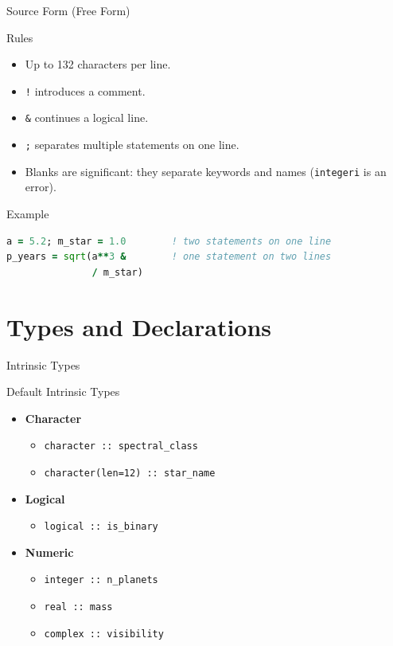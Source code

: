 \begin{frame}[fragile]{Source Form (Free Form)}
\begin{block}{Rules}
\begin{itemize}
\item Up to 132 characters per line.
\item \texttt{!} introduces a comment.
\item \texttt{\&} continues a logical line.
\item \texttt{;} separates multiple statements on one line.
\item Blanks are significant: they separate keywords and names (\texttt{integeri} is an error).
\end{itemize}
\end{block}
\begin{block}{Example}
\begin{lstlisting}[language=Fortran]
a = 5.2; m_star = 1.0        ! two statements on one line
p_years = sqrt(a**3 &        ! one statement on two lines
               / m_star)
\end{lstlisting}
\end{block}
\end{frame}

\section{Types and Declarations}

\begin{frame}{Intrinsic Types}
  \begin{block}{Default Intrinsic Types}
  \begin{itemize}
    \item \textbf{Character}
    \begin{itemize}
      \item \texttt{character :: spectral\_class}
      \item \texttt{character(len=12) :: star\_name}
    \end{itemize}
    \item \textbf{Logical}
    \begin{itemize}
      \item \texttt{logical :: is\_binary}
    \end{itemize}
    \item \textbf{Numeric}
    \begin{itemize}
      \item \texttt{integer :: n\_planets}
      \item \texttt{real :: mass}
      \item \texttt{complex :: visibility}
    \end{itemize}
  \end{itemize}
  \end{block}
\end{frame}

